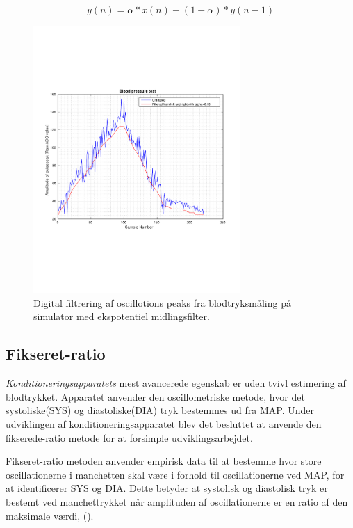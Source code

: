 \begin{equation}
y(n)=\alpha*x(n)+(1-\alpha)*y(n-1)
\label{eq:ekspotentielmidlingsfilter}
\end{equation}
\begin{figure}[H]
	\centering
	\includegraphics[trim={0 0 0 0},clip, width=0.7\textwidth]{billeder/digitalFilterData.pdf}	
	\parbox{10.5cm}{\caption{Digital filtrering af oscillotions peaks fra blodtryksmåling på simulator med ekspotentiel midlingsfilter.}\label{fig:digitalFilterData}}
\end{figure}


\subsection{Fikseret-ratio} \label{Fikseret-ratio}
\textit{Konditioneringsapparatets} mest avancerede egenskab er uden tvivl estimering af blodtrykket. Apparatet anvender den oscillometriske metode, hvor det systoliske(SYS) og diastoliske(DIA) tryk  bestemmes ud fra MAP. Under udviklingen af konditioneringsapparatet blev det besluttet at anvende den fikserede-ratio metode for at forsimple udviklingsarbejdet.

Fikseret-ratio metoden anvender empirisk data til at bestemme hvor store oscillationerne i manchetten skal være i forhold til oscillationerne ved MAP, for at identificerer SYS og DIA. Dette betyder at systolisk og diastolisk tryk er bestemt ved manchettrykket når amplituden af oscillationerne er en ratio af den maksimale værdi, (\cite{drzewiecki1994theory}).

